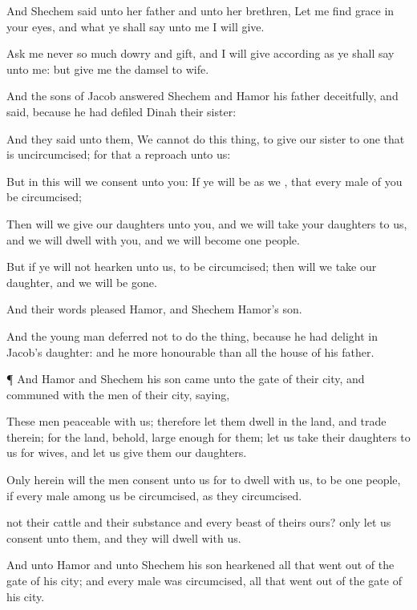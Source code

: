 {And
Shechem
said unto her
father and unto her
brethren, Let me
find
grace in your
eyes, and what ye shall
say unto me I will
give.

Ask me never so
much
dowry and
gift, and I will
give according as ye shall
say unto me: but
give me the
damsel to
wife.

And the
sons of
Jacob
answered
Shechem and
Hamor his
father
deceitfully, and
said, because he had
defiled
Dinah their
sister:

And they
said unto them, We
cannot
do this
thing, to
give our
sister to
one that is
uncircumcised; for that
{} a
reproach unto us:

But in
this will we
consent unto you: If ye will be as we
{}, that every
male of you be
circumcised;

Then will we
give our
daughters unto you, and we will
take your
daughters to us, and we will
dwell with you, and we will become
one
people.

But if ye will not
hearken unto us, to be
circumcised; then will we
take our
daughter, and we will be
gone.


\par }{\PP {}And their
words
pleased
Hamor, and
Shechem
Hamor’s
son.

And the young
man
deferred not to
do the
thing, because he had
delight in
Jacob’s
daughter: and he
{} more
honourable than all the
house of his
father.


\par }{\PP {}¶ And
Hamor and
Shechem his
son
came unto the
gate of their
city, and
communed with the
men of their
city,
saying,

These
men
{}
peaceable
with us; therefore let them
dwell in the
land, and
trade therein; for the
land, behold,
{}
large
enough for
them; let us
take their
daughters to us for
wives, and let us
give them our
daughters.

Only
herein will the
men
consent unto us for to
dwell with us, to be
one
people, if every
male among us be
circumcised, as they
{}
circumcised.

 not their
cattle and their
substance and every
beast of theirs
{} ours? only let us
consent unto them, and they will
dwell with us.

And unto
Hamor and unto
Shechem his
son
hearkened all that went
out of the
gate of his
city; and every
male was
circumcised, all that went
out of the
gate of his
city.


}
